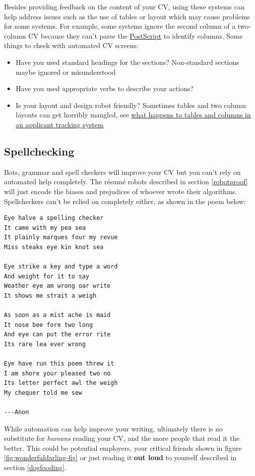 \documentclass[
]{book}
\providecommand{\tightlist}{%
  \setlength{\itemsep}{0pt}\setlength{\parskip}{0pt}}
\begin{document}
Besides providing feedback on the content of your CV, using these systems can help address issues such as the use of tables or layout which may cause problems for some systems. For example, some systems ignore the second column of a two-column CV because they can't parse the \href{https://en.wikipedia.org/wiki/PostScript}{PostScript} to identify columns. Some things to check with automated CV screens:

\begin{itemize}
\tightlist
\item
  Have you used standard headings for the sections? Non-standard sections maybe ignored or misunderstood
\item
  Have you used appropriate verbs to describe your actions?
\item
  Is your layout and design robot friendly? Sometimes tables and two column layouts can get horribly mangled, see \href{https://www.jobscan.co/blog/resume-tables-columns-ats/}{what happens to tables and columns in an applicant tracking system} \citep{jobscan}
\end{itemize}

\hypertarget{spelling}{%
\subsection{Spellchecking}\label{spelling}}

Bots, grammar and spell checkers will improve your CV but you can't rely on automated help completely. The résumé robots described in section \ref{robotproof} will just encode the biases and prejudices of whoever wrote their algorithms. Spellcheckers can't be relied on completely either, as shown in the poem below:

\begin{verbatim}
Eye halve a spelling checker
It came with my pea sea
It plainly marques four my revue
Miss steaks eye kin knot sea

Eye strike a key and type a word
And weight for it to say
Weather eye am wrong oar write
It shows me strait a weigh

As soon as a mist ache is maid
It nose bee fore two long
And eye can put the error rite
Its rare lea ever wrong

Eye have run this poem threw it
I am shore your pleased two no
Its letter perfect awl the weigh
My chequer told me sew

---Anon
\end{verbatim}

While automation can help improve your writing, ultimately there is no substitute for \emph{humans} reading your CV, and the more people that read it the better. This could be potential employers, your critical friends shown in figure \ref{fig:wonderfuldarling-fig} or just reading it \textbf{out loud} to yourself described in section \ref{dogfooding}.
\end{document}
